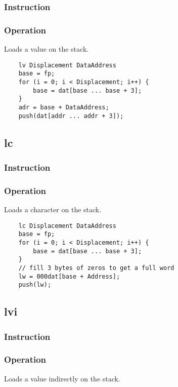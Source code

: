 \subsubsection{Instruction}

\subsubsection{Operation}
Loads a value on the stack.

	\begin{lstlisting}
	lv Displacement DataAddress
	base = fp;
	for (i = 0; i < Displacement; i++) {
		base = dat[base ... base + 3];
	}
	adr = base + DataAddress;
	push(dat[addr ... addr + 3]);
	\end{lstlisting}

\subsection{lc}
\subsubsection{Instruction}

\subsubsection{Operation}
Loads a character on the stack.

	\begin{lstlisting}
	lc Displacement DataAddress
	base = fp;
	for (i = 0; i < Displacement; i++) {
		base = dat[base ... base + 3];
	}
	// fill 3 bytes of zeros to get a full word
	lw = 000dat[base + Address];
	push(lw);
	\end{lstlisting}

\subsection{lvi}
\subsubsection{Instruction}

\subsubsection{Operation}
Loads a value indirectly on the stack.

